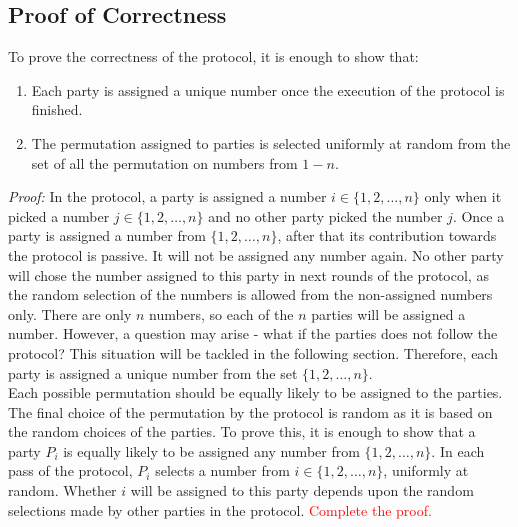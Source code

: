 \documentclass{llncs}
\begin{document}
\subsection{Proof of Correctness}
To prove the correctness of the protocol, it is enough to show that:
\begin{enumerate}
\item Each party is assigned a unique number once the execution of the protocol is finished.
\item The permutation assigned to parties is selected uniformly at random from the set of all the permutation on numbers from $1-n$.
\end{enumerate}
\textit{Proof:} In the protocol, a party is assigned a number $i\in \{1,2,\dots ,n\}$ only when it picked a number $j\in \{1,2,\dots ,n\}$ and no other party picked the number $j$. Once a party is assigned a number from $\{1,2,\dots ,n\}$, after that its contribution towards the protocol is passive. It will not be assigned any number again. No other party will chose the number assigned to this party in next rounds of the protocol, as the random selection of the numbers is allowed from the non-assigned numbers only. There are only $n$ numbers, so each of the $n$ parties will be assigned a number. However, a question may arise - what if the parties does not follow the protocol? This situation will be tackled in the following section. Therefore, each party is assigned a unique number from the set $\{1,2,\dots ,n\}$.\\
Each possible permutation should be equally likely to be assigned to the parties. The final choice of the permutation by the protocol is random as it is based on the random choices of the parties. To prove this, it is enough to show that a party $P_i$ is equally likely to be assigned any number from $\{1,2,\dots ,n\}$. In each pass of the protocol, $P_i$ selects a number from $i\in \{1,2,\dots ,n\}$, uniformly at random. Whether $i$ will be assigned to this party depends upon the random selections made by other parties in the protocol. \textcolor{red}{Complete the proof.}
\end{document}
